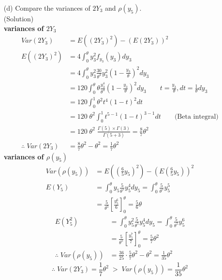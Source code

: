\documentclass{oblivoir}
\newcommand{\flr}[1]{\left ( #1 \right )}
\newcommand{\tlr}[1]{\left [ #1 \right]}
\newcommand{\blue}[1]{{\color{blue} #1}}
\begin{document}
\begin{enumerate}
\begin{enumerate}
\vspace{3mm}
\item[(d)]
Compare the variances of $2Y_3$ and $\rho(y_5)$.\\
\blue{(Solution)} \\
\textbf{variances of $2Y_3$}
\begin{align*}
Var(2Y_3) &= E((2Y_3)^2) - (E(2Y_3))^2 \\
E((2Y_3)^2) &= 4 \int_0^{\theta} y_3^2 f_{y_3}(y_3) dy_3 \\
&= 4 \int_0^{\theta} y_3^2 \frac{30}{\theta^3} y_3^2 \flr{1-\frac{y_3}{\theta}}^2 dy_3 \\
&= 120 \int_0^{\theta} \theta \frac{y_3^4}{\theta^4} \flr{1-\frac{y_3}{\theta}}^2 dy_3 \qquad t = \frac{y_3}{\theta}, dt = \frac{1}{\theta} dy_3\\
&= 120 \int_0^1 \theta^2 t^4 (1-t)^2 dt \\
&= 120 \; \theta^2 \int_0^1 t^{5-1} (1-t)^{3-1}dt \qquad \mbox{(Beta integral)}\\
&= 120 \; \theta^2 \; \frac{\Gamma(5) \times \Gamma(3)}{\Gamma(5+3)} = \frac{8}{7} \theta^2 \\
\therefore \; Var(2Y_3) &= \frac{8}{7} \theta^2 - \theta^2 = \frac{1}{7}\theta^2
\end{align*}
\textbf{variances of $\rho(y_5)$}
\begin{align*}
Var(\rho(y_5)) &= E\flr{\flr{\frac{6}{5} y_5}^2} - \flr{E\flr{\frac{6}{5} y_5}}^2 \\
E(Y_5) &= \int_0^{\theta} y_5 \frac{5}{\theta^5} y_5^4 dy_5 = \int_0^{\theta} \frac{5}{\theta^5} y_5^5 \\
&= \frac{5}{\theta^5} \tlr{\frac{y_5^6}{6}}_0^{\theta} = \frac{5}{6} \theta
\end{align*}
\begin{align*}
E(Y_5^2) &= \int_0^{\theta} y_5^2 \frac{5}{\theta^5} y_5^4 dy_5 = \int_0^{\theta} \frac{5}{\theta^5} y_5^6 \\
&= \frac{5}{\theta^5} \tlr{\frac{y_5^7}{7}}_0^{\theta} = \frac{5}{7} \theta^2 \\
\therefore \; Var(\rho(y_5)) &= \frac{36}{25} \cdot \frac{5}{7} \theta^2 - \theta^2 = \frac{1}{35} \theta^2
\end{align*}
$$
\therefore \; Var(2Y_3) = \frac{1}{7} \theta^2 \; > \; Var(\rho(y_5)) = \frac{1}{35} \theta^2
$$
\end{enumerate}


\end{enumerate}
\end{document}
